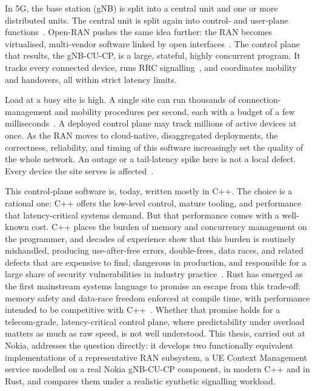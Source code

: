 \documentclass[english,twoside,openright,a4paper,censored,csm,software-track-2020]{HYthesisML}
\begin{document}
In 5G, the base station (gNB) is split into a central unit and one or more distributed
units. The central unit is split again into control- and user-plane
functions~\cite{3gpp38401,3gpp38300}. Open-RAN pushes the same idea further: the RAN
becomes virtualised, multi-vendor software linked by open
interfaces~\cite{polese2023oran}. The control plane that results, the gNB-CU-CP, is a
large, stateful, highly concurrent program. It tracks every connected device, runs RRC
signalling~\cite{3gpp38331}, and coordinates mobility and handovers, all within strict
latency limits.

Load at a busy site is high. A single site can run thousands of connection-management and
mobility procedures per second, each with a budget of a few
milliseconds~\cite{3gpp38913}. A deployed control plane may track millions of active
devices at once. As the RAN moves to cloud-native, disaggregated deployments, the
correctness, reliability, and timing of this software increasingly set the quality of the
whole network. An outage or a tail-latency spike here is not a local defect. Every device
the site serves is affected~\cite{dean2013tail,barroso2017microseconds}.

This control-plane software is, today, written mostly in C++. The choice is a
rational one: C++ offers the low-level control, mature tooling, and performance that
latency-critical systems demand. But that performance comes with a well-known cost. C++
places the burden of memory and concurrency management on the programmer, and decades of
experience show that this burden is routinely mishandled, producing use-after-free errors,
double-frees, data races, and related defects that are expensive to find, dangerous in
production, and responsible for a large share of security vulnerabilities in industry
practice~\cite{msrc2019memory,google2022android}. Rust has emerged as the first mainstream
systems language to promise an escape from this trade-off: memory safety and data-race
freedom enforced at compile time, with performance intended to be competitive with
C++~\cite{klabnik2023rust,jung2018rustbelt}. Whether that promise holds for a
telecom-grade, latency-critical control plane, where predictability under overload matters
as much as raw speed, is not well understood. This thesis, carried out at Nokia, addresses
the question directly: it develops two functionally equivalent implementations of a
representative RAN subsystem, a UE Context Management service modelled on a real Nokia
gNB-CU-CP component, in modern C++ and in Rust, and compares them under a realistic
synthetic signalling workload.
\end{document}
